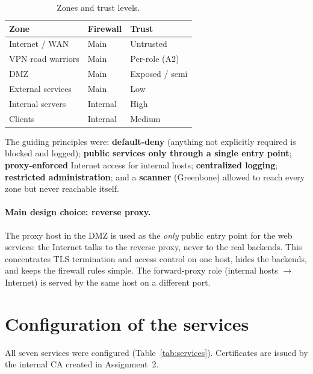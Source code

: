 \documentclass[twocolumn]{NobArticle}
\begin{document}
\begin{table}[H]
\centering
\begin{tabular}{lll}
\toprule
\textbf{Zone} & \textbf{Firewall} & \textbf{Trust} \\
\midrule
Internet / WAN      & Main     & Untrusted \\
VPN road warriors   & Main     & Per-role (A2) \\
DMZ                 & Main     & Exposed / semi \\
External services   & Main     & Low \\
Internal servers    & Internal & High \\
Clients             & Internal & Medium \\
\bottomrule
\end{tabular}
\caption{Zones and trust levels.}
\label{tab:trust}
\end{table}

The guiding principles were: \textbf{default-deny} (anything not explicitly
required is blocked and logged); \textbf{public services only through a single
entry point}; \textbf{proxy-enforced} Internet access for internal hosts;
\textbf{centralized logging}; \textbf{restricted administration}; and a
\textbf{scanner} (Greenbone) allowed to reach every zone but never reachable
itself.

\paragraph{Main design choice: reverse proxy.}
The proxy host in the DMZ is used as the \textit{only} public entry point for
the web services: the Internet talks to the reverse proxy, never to the real
backends. This concentrates TLS termination and access control on one host,
hides the backends, and keeps the firewall rules simple. The forward-proxy role
(internal hosts $\to$ Internet) is served by the same host on a different port.

\section{Configuration of the services}

All seven services were configured (Table~\ref{tab:services}). Certificates are
issued by the internal CA created in Assignment~2.
\end{document}
